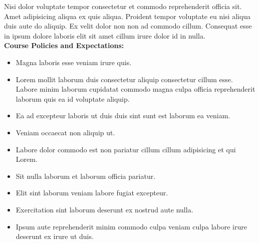 \documentclass[11pt]{article}
\begin{document}
Nisi dolor voluptate tempor consectetur et commodo reprehenderit officia sit. Amet adipisicing aliqua ex quis aliqua. Proident tempor voluptate eu nisi aliqua duis aute do aliquip. Ex velit dolor non non ad commodo cillum. Consequat esse in ipsum dolore laboris elit sit amet cillum irure dolor id in nulla.\\

\textbf {\large Course Policies and Expectations:} 

\begin{itemize} \itemsep-0.4em
  \item Magna laboris esse veniam irure quis.  
  \item Lorem mollit laborum duis consectetur aliquip consectetur cillum esse. Labore minim laborum cupidatat commodo magna culpa officia reprehenderit laborum quis ea id voluptate aliquip. 
  \item Ea ad excepteur laboris ut duis duis sint sunt est laborum ea veniam.
  \item Veniam occaecat non aliquip ut.
  \item Labore dolor commodo est non pariatur cillum cillum adipisicing et qui Lorem.
  \item Sit nulla laborum et laborum officia pariatur.
  \item Elit sint laborum veniam labore fugiat excepteur.  
  \item Exercitation sint laborum deserunt ex nostrud aute nulla.
  \item Ipsum aute reprehenderit minim commodo culpa veniam culpa labore irure deserunt ex irure ut duis.
  
\end{itemize}
\end{document}
